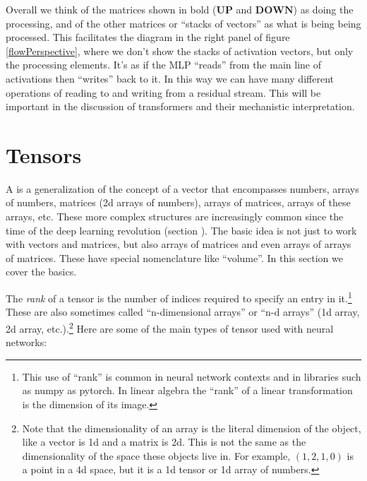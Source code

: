 Overall we think of the matrices shown in bold ($\mathbf{UP}$ and $\mathbf{DOWN}$) as doing the processing, and of the other matrices or ``stacks of vectors'' as what is being being processed. This facilitates the diagram in the right panel of figure  \ref{flowPerspective}, where we don't show the stacks of activation vectors, but only the processing elements. It's as if the MLP ``reads'' from the main line of activations then ``writes'' back to it. In this way we can have many different operations of reading to and writing from a residual stream. This will be important in the discussion of transformers and their mechanistic interpretation.

\section{Tensors}\label{sect_tensors}


A  is a generalization of the concept of a vector that encompasses numbers, arrays of numbers, matrices (2d arrays of numbers), arrays of matrices, arrays of these arrays, etc. These more complex structures are increasingly common since the time of the deep learning revolution (section ). The basic idea is not just to work with vectors and matrices, but also arrays of matrices and even arrays of arrays of matrices. These have special nomenclature like ``volume''. In this section we cover the basics.

The \emph{rank} of a  tensor is the number of indices required to specify an entry in it.\footnote{This use of ``rank'' is common in neural network contexts and in libraries such as numpy as pytorch. In linear algebra the ``rank''  of a linear transformation is the dimension of its image.} These are also sometimes called ``n-dimensional arrays'' or ``n-d arrays'' (1d array, 2d array, etc.).\footnote{Note that the dimensionality of an array is the literal dimension of the object, like a vector is 1d and a matrix is 2d. This is not the same as the dimensionality of the space these objects live in. For example, $(1,2,1,0)$ is a point in a 4d space, but it is a 1d tensor or 1d array of numbers.} Here are some of the main types of tensor used with neural networks:

